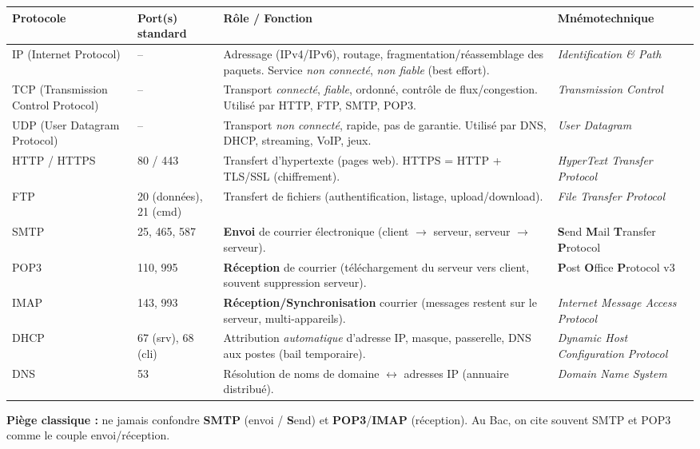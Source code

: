 \documentclass[11pt]{article}
\newcommand{\cle}[1]{{\popxbold\color{popdark}#1}}
\begin{document}
\begin{propriete}
\begin{center}
\begin{tabularx}{\linewidth}{|l|l|X|l|}
\hline
\rowcolor{popblueL} \textbf{Protocole} & \textbf{Port(s) standard} & \textbf{Rôle / Fonction} & \textbf{Mnémotechnique} \\
\hline
\cle{IP} (Internet Protocol) & -- & Adressage (IPv4/IPv6), routage, fragmentation/réassemblage des paquets. Service \emph{non connecté}, \emph{non fiable} (best effort). & \emph{Identification \& Path} \\
\cle{TCP} (Transmission Control Protocol) & -- & Transport \emph{connecté}, \emph{fiable}, ordonné, contrôle de flux/congestion. Utilisé par HTTP, FTP, SMTP, POP3. & \emph{Transmission Control} \\
\cle{UDP} (User Datagram Protocol) & -- & Transport \emph{non connecté}, rapide, pas de garantie. Utilisé par DNS, DHCP, streaming, VoIP, jeux. & \emph{User Datagram} \\
\hline
\cle{HTTP} / \cle{HTTPS} & 80 / 443 & Transfert d'hypertexte (pages web). HTTPS = HTTP + TLS/SSL (chiffrement). & \emph{HyperText Transfer Protocol} \\
\cle{FTP} & 20 (données), 21 (cmd) & Transfert de fichiers (authentification, listage, upload/download). & \emph{File Transfer Protocol} \\
\cle{SMTP} & 25, 465, 587 & \textbf{Envoi} de courrier électronique (client $\rightarrow$ serveur, serveur $\rightarrow$ serveur). & \textbf{S}end \textbf{M}ail \textbf{T}ransfer \textbf{P}rotocol \\
\cle{POP3} & 110, 995 & \textbf{Réception} de courrier (téléchargement du serveur vers client, souvent suppression serveur). & \textbf{P}ost \textbf{O}ffice \textbf{P}rotocol v3 \\
\cle{IMAP} & 143, 993 & \textbf{Réception/Synchronisation} courrier (messages restent sur le serveur, multi-appareils). & \emph{Internet Message Access Protocol} \\
\cle{DHCP} & 67 (srv), 68 (cli) & Attribution \emph{automatique} d'adresse IP, masque, passerelle, DNS aux postes (bail temporaire). & \emph{Dynamic Host Configuration Protocol} \\
\cle{DNS} & 53 & Résolution de noms de domaine $\leftrightarrow$ adresses IP (annuaire distribué). & \emph{Domain Name System} \\
\hline
\end{tabularx}
\end{center}
\textbf{Piège classique :} ne jamais confondre \textbf{SMTP} (envoi / \textbf{S}end) et \textbf{POP3}/\textbf{IMAP} (réception). Au Bac, on cite souvent SMTP et POP3 comme le couple envoi/réception.
\end{propriete}
\end{document}
